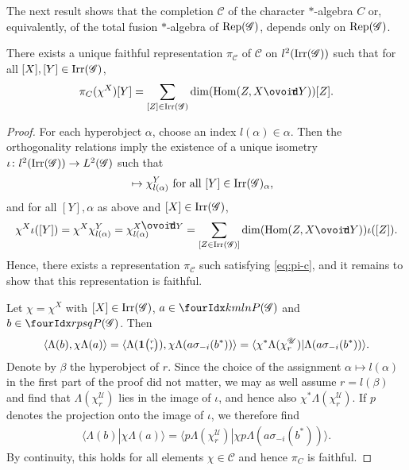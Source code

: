 The next result shows that the completion $\mathcal{C}$ of the
character $*$-algebra $C$ or, equivalently, of the total fusion
$*$-algebra of $\mathrm{Rep}(\mathscr{G})$,  depends only on
$\mathrm{Rep}(\mathscr{G})$.

\begin{Prop}
  There exists a unique faithful representation $\pi_{\mathcal{C}}$ of
  $\mathcal{C}$ on $l^{2}(\mathrm{Irr}(\mathscr{G}))$ such that for all
  $[X],[Y] \in \mathrm{Irr}(\mathscr{G})$,
  \begin{align} \label{eq:pi-c}
    \pi_{C}(\chi^{X})[Y] = \sum_{[Z] \in \Irr(\mathscr{G})}
    \dim(\Hom(Z,X\Circt Y))[Z].
  \end{align}
\end{Prop}
\begin{proof}
  For each hyperobject $\alpha$, choose an index $l(\alpha) \in
  \alpha$. Then the orthogonality relations \cite[Corollary
2.23]{DCT1} imply the existence of a unique isometry $\iota\colon
  l^{2}(\mathrm{Irr}(\mathscr{G})) \to L^{2}(\mathscr{G})$ such that
\begin{align*}
  [Y] &\mapsto \chi^{Y}_{l(\alpha)} \text{ for all } [Y] \in
  \Irr(\mathscr{G})_{\alpha},
\end{align*}
 and for all $[Y],\alpha$ as above and $[X] \in
\mathrm{Irr}(\mathscr{G})$,
\begin{align*}
  \chi^{X}\iota([Y]) = \chi^{X}\chi^{Y}_{l(\alpha)} = \chi^{X \Circt
    Y}_{l(\alpha)} =  \sum_{[Z \in \Irr(\mathscr{G})]}
  \dim(\Hom(Z,X\Circt Y)) \iota([Z]).
\end{align*}
Hence,   there   exists  a representation $\pi_{\mathcal{C}}$ such
satisfying \eqref{eq:pi-c}, and it remains to show that this
representation is faithful. 

Let $\chi = \chi^X$ with $[X] \in \mathrm{Irr}(\mathscr{G})$, $a\in
\Gr{P(\mathscr{G})}{k}{l}{m}{n}$ and $b\in
\Gr{P(\mathscr{G})}{r}{s}{p}{q}$. Then
\begin{align*}
  \langle
\Lambda(b),\chi \Lambda(a)\rangle = \langle \Lambda(
\mathbf{1}{\tiny {\begin{pmatrix} r\\r\end{pmatrix}}}),\chi \Lambda(a\sigma_{-i}(b^*))\rangle  =
 \langle \chi^{*} \Lambda(\chi^{\mathscr{U}}_{r})  |
 \Lambda(a\sigma_{-i}(b^*))\rangle.
\end{align*}
Denote by $\beta$ the hyperobject of $r$. Since the choice of the
assignment $\alpha \mapsto l(\alpha)$ in the first part of the proof
did not matter,  we may as well assume
$r=l(\beta)$ and find that $\Lambda(\chi^{\mathscr{U}}_{r})$ lies in
the image of $\iota$, and hence also $\chi^{*}
\Lambda(\chi^{\mathscr{U}}_{r})$. If $p$ denotes the projection onto
the image of $\iota$, we therefore find
\begin{align*}
  \langle
\Lambda(b) | \chi \Lambda(a)\rangle = 
 \langle p \Lambda(\chi^{\mathscr{U}}_{r})  | \chi
p \Lambda(a\sigma_{-i}(b^*))\rangle.
\end{align*}
By continuity, this holds for all elements $\chi \in \mathcal{C}$ and hence $\pi_{C}$ is faithful.
\end{proof}


